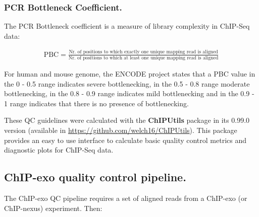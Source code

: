 \documentclass{bmcart}\usepackage[]{graphicx}\usepackage[]{color}
\begin{document}
\subsubsection*{PCR Bottleneck Coefficient.}

The PCR Bottleneck coefficient is a measure of library complexity in
ChIP-Seq data:

\begin{align}
  \mbox{PBC} = \frac{\text{Nr. of positions to which exactly one
      unique mapping read is aligned}}{\text{Nr. of positions to
      which at least one unique mapping read is aligned}} \nonumber
\end{align}

For human and mouse genome, the ENCODE project states that a PBC value
in the 0 - 0.5 range indicates severe bottlenecking, in the 0.5 - 0.8
range moderate bottlenecking, in the 0.8 - 0.9 range indicates mild
bottlenecking and in the 0.9 - 1 range indicates that there is no
presence of bottlenecking.

These QC guidelines were calculated with the \textbf{ChIPUtils}
package in its 0.99.0 version (available in
\url{https://github.com/welch16/ChIPUtils}). This package provides an
easy to use interface to calculate basic quality control metrics and
diagnostic plots for ChIP-Seq data.

\subsection*{ChIP-exo quality control pipeline.}

The ChIP-exo QC pipeline requires a set of aligned reads from a
ChIP-exo (or ChIP-nexus) experiment. Then:
\end{document}
